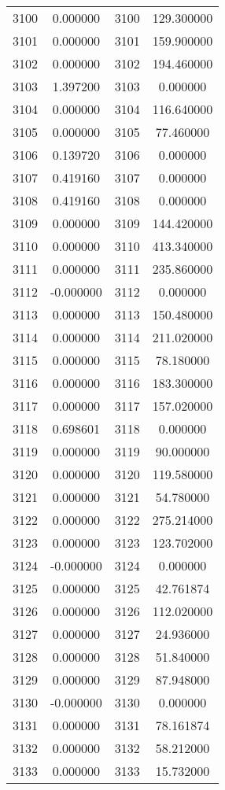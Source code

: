 \documentclass[12pt]{article}
\begin{document}
\begin{longtable}{@{}cccc@{}}
3100 & 0.000000 & 3100 & 129.300000 \\
3101 & 0.000000 & 3101 & 159.900000 \\
3102 & 0.000000 & 3102 & 194.460000 \\
3103 & 1.397200 & 3103 & 0.000000 \\
3104 & 0.000000 & 3104 & 116.640000 \\
3105 & 0.000000 & 3105 & 77.460000 \\
3106 & 0.139720 & 3106 & 0.000000 \\
3107 & 0.419160 & 3107 & 0.000000 \\
3108 & 0.419160 & 3108 & 0.000000 \\
3109 & 0.000000 & 3109 & 144.420000 \\
3110 & 0.000000 & 3110 & 413.340000 \\
3111 & 0.000000 & 3111 & 235.860000 \\
3112 & -0.000000 & 3112 & 0.000000 \\
3113 & 0.000000 & 3113 & 150.480000 \\
3114 & 0.000000 & 3114 & 211.020000 \\
3115 & 0.000000 & 3115 & 78.180000 \\
3116 & 0.000000 & 3116 & 183.300000 \\
3117 & 0.000000 & 3117 & 157.020000 \\
3118 & 0.698601 & 3118 & 0.000000 \\
3119 & 0.000000 & 3119 & 90.000000 \\
3120 & 0.000000 & 3120 & 119.580000 \\
3121 & 0.000000 & 3121 & 54.780000 \\
3122 & 0.000000 & 3122 & 275.214000 \\
3123 & 0.000000 & 3123 & 123.702000 \\
3124 & -0.000000 & 3124 & 0.000000 \\
3125 & 0.000000 & 3125 & 42.761874 \\
3126 & 0.000000 & 3126 & 112.020000 \\
3127 & 0.000000 & 3127 & 24.936000 \\
3128 & 0.000000 & 3128 & 51.840000 \\
3129 & 0.000000 & 3129 & 87.948000 \\
3130 & -0.000000 & 3130 & 0.000000 \\
3131 & 0.000000 & 3131 & 78.161874 \\
3132 & 0.000000 & 3132 & 58.212000 \\
3133 & 0.000000 & 3133 & 15.732000 \\

\end{longtable}
\end{document}
